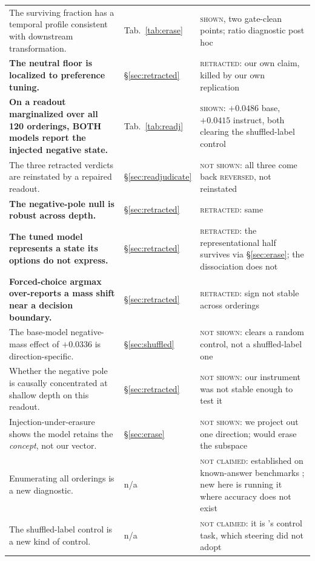 \documentclass{article}
\begin{document}
{\begin{longtable}{@{}L{0.50\textwidth} L{0.20\textwidth} L{0.24\textwidth}@{}}
The surviving fraction has a temporal profile consistent with downstream transformation. & Tab.~\ref{tab:erase} & \textsc{shown}, two gate-clean points; ratio diagnostic post hoc \\
\textbf{The neutral floor is localized to preference tuning.} & \S\ref{sec:retracted} & \textsc{retracted}: our own claim, killed by our own replication \\
\textbf{On a readout marginalized over all 120 orderings, BOTH models report the injected negative state.} & Tab.~\ref{tab:readj} & \textsc{shown}: $+0.0486$ base, $+0.0415$ instruct, both clearing the shuffled-label control \\
The three retracted verdicts are reinstated by a repaired readout. & \S\ref{sec:readjudicate} & \textsc{not shown}: all three come back \textsc{reversed}, not reinstated \\
\textbf{The negative-pole null is robust across depth.} & \S\ref{sec:retracted} & \textsc{retracted}: same \\
\textbf{The tuned model represents a state its options do not express.} & \S\ref{sec:retracted} & \textsc{retracted}: the representational half survives via \S\ref{sec:erase}; the dissociation does not \\
\textbf{Forced-choice argmax over-reports a mass shift near a decision boundary.} & \S\ref{sec:retracted} & \textsc{retracted}: sign not stable across orderings \\
The base-model negative-mass effect of $+0.0336$ is direction-specific. & \S\ref{sec:shuffled} & \textsc{not shown}: clears a random control, not a shuffled-label one \\
Whether the negative pole is causally concentrated at shallow depth on this readout. & \S\ref{sec:retracted} & \textsc{not shown}: our instrument was not stable enough to test it \\
Injection-under-erasure shows the model retains the \emph{concept}, not our vector. & \S\ref{sec:erase} & \textsc{not shown}: we project out one direction; \citet{belrose2023} would erase the subspace \\
Enumerating all orderings is a new diagnostic. & n/a & \textsc{not claimed}: established on known-answer benchmarks \citep{tamba2026, cacioli2026}; new here is running it where accuracy does not exist \\
The shuffled-label control is a new kind of control. & n/a & \textsc{not claimed}: it is \citet{hewitt2019}'s control task, which steering did not adopt \\

\end{longtable}}
\end{document}

